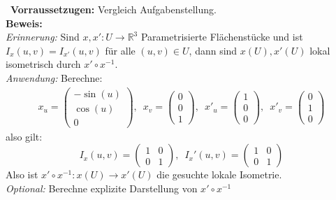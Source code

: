 \begin{solution}
 \
  \textbf{Vorraussetzugen:} Vergleich Aufgabenstellung. \\
  \textbf{Beweis:} \\
  \emph{Erinnerung:} Sind \( x, x': U \to \mathbb{R}^3 \) Parametrisierte Flächenstücke und ist \( I_x(u,v) = I_{x'}(u,v) \) für alle \( (u,v) \in U \), dann sind \( x(U), x'(U) \) lokal isometrisch durch \( x' \circ x^{-1} \). \\
  \emph{Anwendung:} Berechne: \\
  \begin{align*}
    x_u = \begin{pmatrix} 
      -\sin(u) \\ \cos(u) \\ 0  
    \end{pmatrix},\enspace
    x_v = \begin{pmatrix} 
      0 \\ 0 \\ 1 
    \end{pmatrix},\enspace
    {x'}_u = \begin{pmatrix}  
      1 \\ 0 \\ 0 
    \end{pmatrix},\enspace
    {x'}_v= \begin{pmatrix} 
      0 \\ 1 \\ 0 
    \end{pmatrix}
  \end{align*}
  also gilt:
  \begin{equation*}
    I_x(u,v) = \begin{pmatrix}
      1 & 0 \\
      0 & 1
    \end{pmatrix}, \enspace
    I_x'(u,v) = \begin{pmatrix}
      1 & 0 \\
      0 & 1
    \end{pmatrix}
  \end{equation*}
  Also ist \( x' \circ x^{-1}: x(U) \to x'(U) \) die gesuchte lokale Isometrie. \\
  \emph{Optional:} Berechne explizite Darstellung von \( x' \circ x^{-1} \)

\end{solution}

